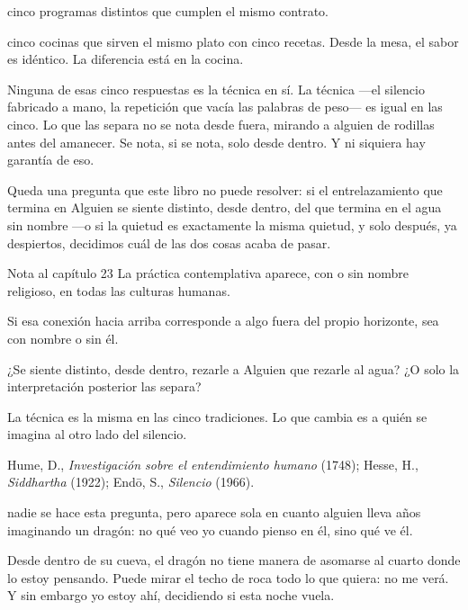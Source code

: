 \begin{fisica}
 cinco programas distintos que cumplen el mismo contrato.

 cinco cocinas que sirven el mismo plato con cinco recetas. Desde la mesa, el sabor es idéntico. La diferencia está en la cocina.
\end{fisica}
Ninguna de esas cinco respuestas es la técnica en sí. La técnica —el silencio fabricado a mano, la repetición que vacía las palabras de peso— es igual en las cinco. Lo que las separa no se nota desde fuera, mirando a alguien de rodillas antes del amanecer. Se nota, si se nota, solo desde dentro. Y ni siquiera hay garantía de eso.

Queda una pregunta que este libro no puede resolver: si el entrelazamiento que termina en Alguien se siente distinto, desde dentro, del que termina en el agua sin nombre —o si la quietud es exactamente la misma quietud, y solo después, ya despiertos, decidimos cuál de las dos cosas acaba de pasar.

\begin{notacap}{Nota al capítulo 23}
 La práctica contemplativa aparece, con o sin nombre religioso, en todas las culturas humanas.

 Si esa conexión hacia arriba corresponde a algo fuera del propio horizonte, sea con nombre o sin él.

 ¿Se siente distinto, desde dentro, rezarle a Alguien que rezarle al agua? ¿O solo la interpretación posterior las separa?

 La técnica es la misma en las cinco tradiciones. Lo que cambia es a quién se imagina al otro lado del silencio.

 Hume, D., \emph{Investigación sobre el entendimiento humano} (1748); Hesse, H., \emph{Siddhartha} (1922); Endō, S., \emph{Silencio} (1966).
\end{notacap}
\noindent {} nadie se hace esta pregunta, pero aparece sola en cuanto alguien lleva años imaginando un dragón: no qué veo yo cuando pienso en él, sino qué ve él.

Desde dentro de su cueva, el dragón no tiene manera de asomarse al cuarto donde lo estoy pensando. Puede mirar el techo de roca todo lo que quiera: no me verá. Y sin embargo yo estoy ahí, decidiendo si esta noche vuela.

